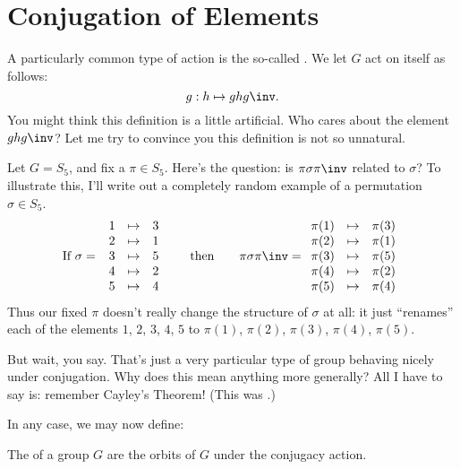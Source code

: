 \section{Conjugation of Elements}
A particularly common type of action is the so-called .
We let $G$ act on itself as follows:
\[ g : h \mapsto ghg\inv. \]
You might think this definition is a little artificial.
Who cares about the element $ghg\inv$?
Let me try to convince you this definition is not so unnatural.
\begin{example}
	[Conjugacy in $S_n$]
	Let $G = S_5$, and fix a $\pi \in S_5$.
	Here's the question: is $\pi \sigma \pi \inv$ related to $\sigma$?
	To illustrate this,
	I'll write out a completely random example of a permutation $\sigma \in S_5$.
	\[
		\text{If }
		\sigma = \;
		\begin{array}{ccc}
		1 & \mapsto & 3 \\
		2 & \mapsto & 1 \\
		3 & \mapsto & 5 \\
		4 & \mapsto & 2 \\
		5 & \mapsto & 4
		\end{array}
		\qquad
		\text{then}
		\qquad
		\pi \sigma \pi\inv = 
		\begin{array}{ccc}
		\pi(1) & \mapsto & \pi(3) \\
		\pi(2) & \mapsto & \pi(1) \\
		\pi(3) & \mapsto & \pi(5) \\
		\pi(4) & \mapsto & \pi(2) \\
		\pi(5) & \mapsto & \pi(4)
		\end{array}
	\]
	Thus our fixed $\pi$ doesn't really change the structure of $\sigma$ at all:
	it just ``renames'' each of the elements $1$, $2$, $3$, $4$, $5$
	to $\pi(1)$, $\pi(2)$, $\pi(3)$, $\pi(4)$, $\pi(5)$.
\end{example}
But wait, you say.
That's just a very particular type of group behaving nicely under conjugation.
Why does this mean anything more generally?
All I have to say is: remember Cayley's Theorem!
(This was .)

In any case, we may now define:
\begin{definition}
	The  of a group $G$ are the orbits of $G$ under
	the conjugacy action.
\end{definition}

